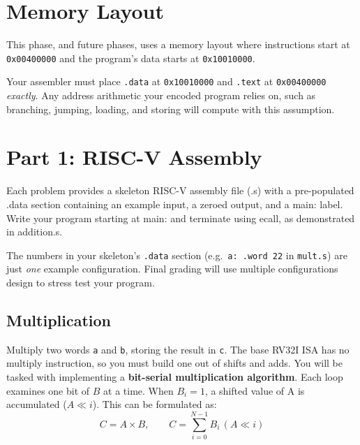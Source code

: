 \documentclass[11pt]{article}
\begin{document}
\section{Memory Layout}
\label{sec:memlayout}
This phase, and future phases, uses a memory layout where instructions start at
\texttt{0x00400000} and the program's data starts at
\texttt{0x10010000}.

\begin{center}
\end{center}

\begin{important}
Your assembler must place \texttt{.data} at \texttt{0x10010000} and
\texttt{.text} at \texttt{0x00400000} \emph{exactly}. Any address
arithmetic your encoded program relies on, such as branching, jumping, loading, and storing will compute with this assumption.
\end{important}

\newpage

\section{Part 1: RISC-V Assembly}
\label{sec:part1}

Each problem provides a skeleton RISC-V assembly file (.s) with a pre-populated .data section containing an example input, a zeroed output, and a main: label. Write your program starting at main: and terminate using ecall, as demonstrated in addition.s.

\begin{important}
The numbers in your skeleton's \texttt{.data} section (e.g.\ \texttt{a: .word 22}
in \texttt{mult.s}) are just \emph{one} example configuration. Final grading will use multiple configurations design to stress test your program.
\end{important}

\subsection{Multiplication}
Multiply two words \texttt{a} and \texttt{b}, storing the result in
\texttt{c}. The base RV32I ISA has no multiply instruction, so you must build one out
of shifts and adds. You will be tasked with implementing a \textbf{bit-serial
multiplication algorithm}. Each loop examines one bit of $B$ at a time. When $B_i = 1$, a shifted value of A is accumulated ($A \ll i$). This can be formulated as:
\[C = A \times B, \qquad C = \sum_{i=0}^{N-1} B_i \,(A \ll i) \]
\end{document}
